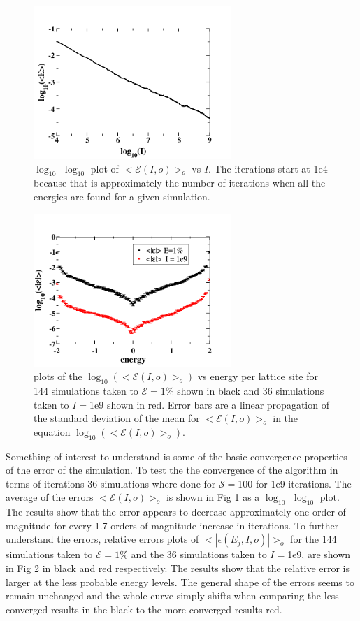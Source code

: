 \documentclass[aps,prl,reprint,superscriptaddress,showkeys]{revtex4-1}
\begin{document}
\begin{figure}
\includegraphics[width=7.5cm]{long_time_error.png}
\caption{\label{log_t_err}$\log_{10}$ $\log_{10}$ plot of $<\mathcal{E}(I,o)>_o$ vs $I$.  The iterations start at 1e4 because that is approximately the number of iterations when all the energies are found for a given simulation. }
\end{figure}
\begin{figure}
\includegraphics[width=7.5cm]{relative_errors.png}
\caption{\label{rel_errors}plots of the $\log_{10}(<\mathcal{E}(I,o)>_o )$ vs  energy per lattice site for 144 simulations taken to $\mathcal{E}=1\%$ shown in black and  36 simulations taken to $I=$1e9 shown in red. Error bars are a linear propagation of the standard deviation of the mean for $<\mathcal{E}(I,o)>_o$ in the equation $\log_{10}(<\mathcal{E}(I,o)>_o )$. }
\end{figure}
Something of interest to understand is some of the basic convergence properties of the error of the simulation. To test the the convergence of the algorithm in terms of iterations  36 simulations where done for  $\mathcal{S}=$100 for 1e9 iterations. The average of the errors $<\mathcal{E}(I,o)>_o$ is shown in Fig \ref{log_t_err}  as a $\log_{10}$ $\log_{10}$  plot. The results show that the error appears to decrease approximately one order of magnitude for every 1.7 orders of magnitude increase in iterations.  To further understand the errors, relative errors plots of $<|\epsilon(E_j,I,o)|>_o$ for the 144 simulations taken to $\mathcal{E}=1\%$ and the 36 simulations taken to $I=$1e9,  are shown in Fig \ref{rel_errors} in black and red respectively. The results show that the relative error is larger at the less probable energy levels. The general shape of the errors seems to remain unchanged and the whole curve simply shifts when comparing the less converged results in the black to the more converged results red. 
\end{document}
